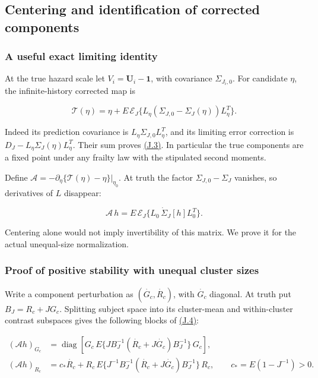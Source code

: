 \documentclass[11pt]{article}
\begin{document}
\subsection{Centering and identification of corrected components}\label{sec:J.2}

\subsubsection{A useful exact limiting identity}\label{sec:J.2.1}

At the true hazard scale let \(V_i=\mathbf U_i-\mathbf1\), with covariance \(\Sigma_{J_i,0}\). For candidate \(\eta\), the infinite-history corrected map is

\begin{equation*}
\mathcal T(\eta)=\eta+
 E\,\mathcal E_J\{L_\eta(\Sigma_{J,0}-\Sigma_J(\eta))L_\eta^T\}.
\tag{J.3}\label{eq:J.3}
\end{equation*}

Indeed its prediction covariance is \(L_\eta\Sigma_{J,0}L_\eta^T\), and its limiting error correction is \(D_J-L_\eta\Sigma_J(\eta)L_\eta^T\). Their sum proves \hyperref[eq:J.3]{(J.3)}. In particular the true components are a fixed point under any frailty law with the stipulated second moments.

Define \(\mathcal A=-\partial_\eta\{\mathcal T(\eta)-\eta\}|_{\eta_0}\). At truth the factor \(\Sigma_{J,0}-\Sigma_J\) vanishes, so derivatives of \(L\) disappear:

\begin{equation*}
\mathcal A\,h=E\,\mathcal E_J\{L_0\,\dot\Sigma_J[h]L_0^T\}.
\tag{J.4}\label{eq:J.4}
\end{equation*}

Centering alone would not imply invertibility of this matrix. We prove it for the actual unequal-size normalization.

\subsubsection{Proof of positive stability with unequal cluster sizes}\label{sec:J.2.2}

Write a component perturbation as \((\dot {G_c},\dot {R_c})\), with \(\dot {G_c}\) diagonal. At truth put \(B_J={R_c}+J{G_c}\). Splitting subject space into its cluster-mean and within-cluster contrast subspaces gives the following blocks of \hyperref[eq:J.4]{(J.4)}:

\begin{equation*}
\begin{aligned}
(\mathcal A h)_{G_c}
 &=\operatorname{diag}\!\left[{G_c}\,E\{J B_J^{-1}(\dot {R_c}+J\dot {G_c})B_J^{-1}\}\,{G_c}\right],\\
(\mathcal A h)_{R_c}
 &=c_*\dot {R_c}+{R_c}\,E\{J^{-1}B_J^{-1}(\dot {R_c}+J\dot {G_c})B_J^{-1}\}\,{R_c},
\qquad c_*=E(1-J^{-1})>0.
\end{aligned}\tag{J.5}\label{eq:J.5}
\end{equation*}
\end{document}
